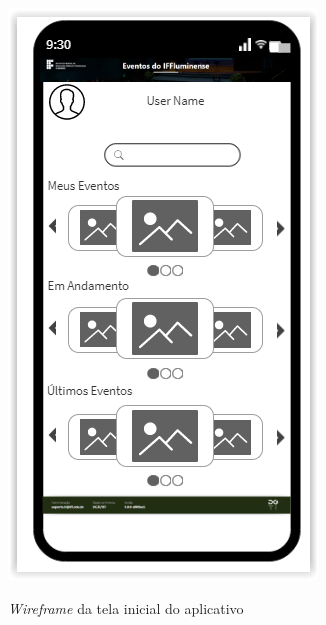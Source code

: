 \begin{figure}[H]
    \centering
    \caption{\textit{Wireframe} da tela inicial do aplicativo}
    \includegraphics[scale=0.81]{figuras/wireframe1.PNG}
    \label{fig:wireframe1}
\end{figure}

